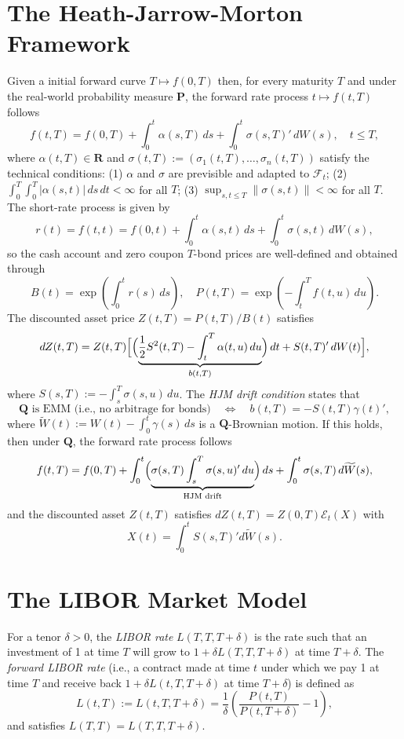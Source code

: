 \documentclass[twocolumn]{amsart}
\renewcommand{\P}{\mathbf{P}}
\newcommand{\Q}{\mathbf{Q}}
\newcommand{\F}{\mathcal{F}}
\newcommand{\R}{\mathbf{R}}
\newcommand{\sE}{\mathcal{E}}
\newcommand{\tW}{\widetilde W}
\begin{document}
\section*{The Heath-Jarrow-Morton Framework}

Given a initial forward curve $T \mapsto f(0,T)$ then, for every maturity $T$  and under the real-world probability measure $\P$, the forward rate process $t \mapsto f(t,T)$ follows
\begin{equation*}
    f(t,T) = f(0,T) + \int_0^t \alpha(s,T)\,ds + \int_0^t \sigma(s,T)'\,dW(s), \quad t \le T,
\end{equation*}
where $\alpha(t,T) \in \R$ and $\sigma(t,T) := (\sigma_1(t,T), \ldots, \sigma_n(t,T))$ satisfy the technical conditions: (1) $\alpha$ and $\sigma$ are previsible and adapted to $\F_t$; (2) $\int_0^T\int_0^T |\alpha(s,t)|\,ds\,dt < \infty$ for all $T$; (3) $\sup_{s,t \le T} \|\sigma(s,t)\| < \infty$ for all $T$. The short-rate process is given by
\begin{equation*}
    r(t) = f(t,t) = f(0,t) + \int_0^t\alpha(s,t)\,ds + \int_0^t \sigma(s,t)\,dW(s),
\end{equation*}
so the cash account and zero coupon $T$-bond prices are well-defined and obtained through
\[
B(t) = \exp\left(\int_0^tr(s)\,ds\right), \quad P(t,T) = \exp\left(-\int_t^Tf(t,u)\,du\right).
\]
The discounted asset price $Z(t,T) = P(t,T)/B(t)$ satisfies
\[
    dZ(t,T) = Z(t,T)\Bigl[\Bigl(\underbrace{\frac12 S^2(t,T) - \int_t^T \alpha(t,u)\,du}_{b(t,T)}\Bigr)\,dt + S(t,T)'\,dW(t)\Bigr],
\]
where $S(s,T) := - \int_s^T \sigma(s,u)\,du$. The \emph{HJM drift condition} states that
\[
    \text{$\Q$ is EMM (i.e., no arbitrage for bonds)} \quad \iff \quad b(t,T) = -S(t,T) \gamma(t)',
\]
where $\tW(t):= W(t) - \int_0^t\gamma(s)\,ds$ is a $\Q$-Brownian motion. If this holds, then under $\Q$, the forward rate process follows
\[
    f(t,T) = f(0,T) + \int_0^t \Bigl(\underbrace{\sigma(s,T)\int_s^T\sigma(s,u)'\,du}_{\text{HJM drift}} \Bigr)\,ds + \int_0^t \sigma(s,T)\,d\tW(s),
\]
and the discounted asset $Z(t,T)$ satisfies $dZ(t,T) = Z(0,T) \sE_t(X)$ with $$X(t) = \int_0^t S(s,T)'d\tW(s).$$

\section*{The LIBOR Market Model}

For a tenor $\delta > 0$, the \emph{LIBOR rate} $L(T,T,T+\delta)$ is the rate such that an investment of 1 at time $T$ will grow to $1+\delta L(T,T,T+\delta)$ at time $T+\delta$. The \emph{forward LIBOR rate} (i.e., a contract made at time $t$ under which we pay 1 at time $T$ and receive back $1+\delta L(t,T,T+\delta)$ at time $T+\delta$) is defined as
\begin{equation*}
    L(t,T) := L(t,T,T+\delta) = \frac{1}{\delta} \left(\frac{P(t,T)}{P(t,T+\delta)} - 1 \right),
\end{equation*}
and satisfies $L(T,T) = L(T,T,T+\delta)$.
\end{document}
